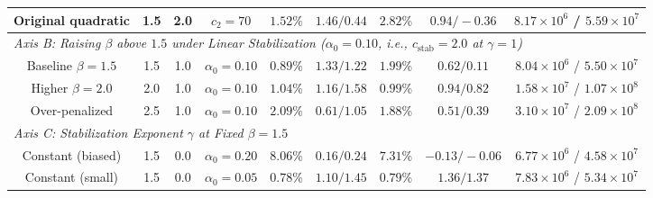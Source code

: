 \documentclass[VANCOUVER]{USG}
\begin{document}
\begin{table}[!t]
{\begin{tabular}{ccccccccc}
            Original quadratic         & 1.5                  & 2.0                   & $c_2 = 70$           & $1.52\%$                             & $1.46 / 0.44$                                                     & $2.82\%$                               & $0.94 / -0.36$                                                    & $8.17\times 10^6$ / $5.59\times 10^7$                      \\
            \midrule
            \multicolumn{9}{l}{\textit{Axis B: Raising $\beta$ above $1.5$ under Linear Stabilization ($\alpha_0 = 0.10$, i.e., $c_{\mathrm{stab}} = 2.0$ at $\gamma = 1$)}} \\
            Baseline $\beta = 1.5$     & 1.5                  & 1.0                   & $\alpha_0 = 0.10$    & $0.89\%$                             & $1.33 / 1.22$                                                     & $1.99\%$                               & $0.62 / 0.11$                                                     & $8.04\times 10^6$ / $5.50\times 10^7$                      \\
            Higher $\beta = 2.0$       & 2.0                  & 1.0                   & $\alpha_0 = 0.10$    & $1.04\%$                             & $1.16 / 1.58$                                                     & $0.99\%$                               & $0.94 / 0.82$                                                     & $1.58\times 10^7$ / $1.07\times 10^8$                      \\
            Over-penalized             & 2.5                  & 1.0                   & $\alpha_0 = 0.10$    & $2.09\%$                             & $0.61 / 1.05$                                                     & $1.88\%$                               & $0.51 / 0.39$                                                     & $3.10\times 10^7$ / $2.09\times 10^8$                      \\
            \midrule
            \multicolumn{9}{l}{\textit{Axis C: Stabilization Exponent $\gamma$ at Fixed $\beta = 1.5$}} \\
            Constant (biased)          & 1.5                  & 0.0                   & $\alpha_0 = 0.20$    & $8.06\%$                             & $0.16 / 0.24$                                                     & $7.31\%$                               & $-0.13 / -0.06$                                                   & $6.77\times 10^6$ / $4.58\times 10^7$                      \\
            Constant (small)           & 1.5                  & 0.0                   & $\alpha_0 = 0.05$    & $0.78\%$                             & $1.10 / 1.45$                                                     & $0.79\%$                               & $1.36 / 1.37$                                                     & $7.83\times 10^6$ / $5.34\times 10^7$                      \\

\end{tabular}}
\end{table}
\end{document}

